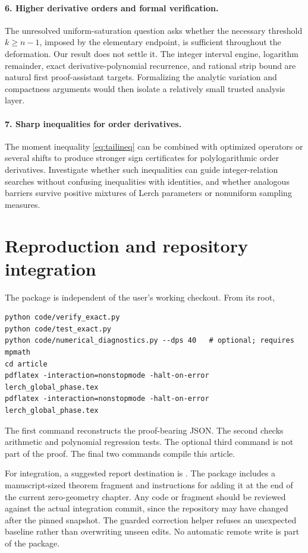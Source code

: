 \documentclass[11pt]{article}
\numberwithin{equation}{section}
\theoremstyle{definition}
\begin{document}
\paragraph{6. Higher derivative orders and formal verification.}
The unresolved uniform-saturation question asks whether the necessary
threshold $k\geq n-1$, imposed by the elementary endpoint, is sufficient
throughout the deformation. Our result does not settle it. The integer
interval engine, logarithm remainder, exact derivative-polynomial
recurrence, and rational strip bound are natural first proof-assistant
targets. Formalizing the analytic variation and compactness arguments
would then isolate a relatively small trusted analysis layer.

\paragraph{7. Sharp inequalities for order derivatives.}
The moment inequality \eqref{eq:tailineq} can be combined with optimized
operators or several shifts to produce stronger sign certificates for
polylogarithmic order derivatives. Investigate whether such inequalities
can guide integer-relation searches without confusing inequalities with
identities, and whether analogous barriers survive positive mixtures of
Lerch parameters or nonuniform sampling measures.

\section{Reproduction and repository integration}
\label{sec:reproduce}
The package is independent of the user's working checkout. From its root,
\begin{verbatim}
python code/verify_exact.py
python code/test_exact.py
python code/numerical_diagnostics.py --dps 40   # optional; requires mpmath
cd article
pdflatex -interaction=nonstopmode -halt-on-error lerch_global_phase.tex
pdflatex -interaction=nonstopmode -halt-on-error lerch_global_phase.tex
\end{verbatim}
The first command reconstructs the proof-bearing JSON. The second checks
arithmetic and polynomial regression tests. The optional third command is
not part of the proof. The final two commands compile this article.

For integration, a suggested report destination is
.
The package includes a manuscript-sized theorem fragment and instructions
for adding it at the end of the current zero-geometry chapter. Any code or fragment
should be reviewed against the actual integration commit, since the
repository may have changed after the pinned snapshot. The guarded
correction helper refuses an unexpected baseline rather than overwriting
unseen edits. No automatic remote write is part of the package.
\end{document}
